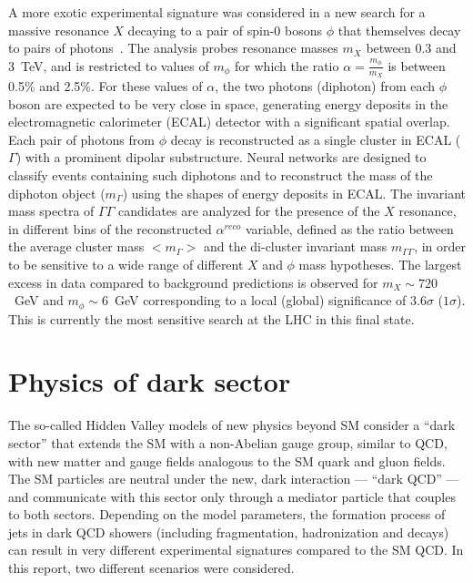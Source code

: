 \documentclass{moriond}
\begin{document}
A more exotic experimental signature was considered in a new search
for a massive resonance $X$ decaying to a pair of spin-0
bosons $\phi$ that themselves decay to pairs of photons~\cite{CMS:2024vjn}.
The analysis probes resonance masses $m_X$ between 0.3 and 3~TeV,
and is restricted to values of $m_{\phi}$ for which the ratio
$\alpha=\frac{m_{\phi}}{m_X}$ is between 0.5\% and 2.5\%. For these
values of $\alpha$, the two photons (diphoton) from each $\phi$ boson
are expected to be very close in space, generating energy deposits
in the electromagnetic calorimeter (ECAL) detector with a significant
spatial overlap.  Each pair of photons from $\phi$ decay is reconstructed
as a single cluster in ECAL ($\Gamma$) with a prominent dipolar
substructure. Neural networks are designed to classify events containing
such diphotons and to reconstruct the mass of the diphoton object ($m_{\Gamma}$)
using the shapes of energy deposits in ECAL. 
The invariant mass spectra of $\Gamma\Gamma$ candidates are
analyzed for the presence of the $X$ resonance, in different bins of
the reconstructed $\alpha^{reco}$ variable, defined as the ratio between the
average cluster mass $<m_{\Gamma}>$ and the di-cluster invariant mass $m_{\Gamma\Gamma}$,
in order to be sensitive to a wide range of different $X$ and $\phi$ mass
hypotheses. The largest excess in data compared to background
predictions is observed for $m_X \sim 720$~GeV and $m_{\phi} \sim 6$~GeV
corresponding to a local (global) significance of $3.6\sigma$
($1\sigma$). This is currently the most sensitive search at the LHC in this
final state.

\section{Physics of dark sector}

The so-called Hidden Valley models of new physics beyond SM consider a
``dark sector'' that extends the SM with a non-Abelian gauge group,
similar to QCD, with new matter and gauge
fields analogous to the SM quark and gluon fields. The SM particles
are neutral under the new, dark interaction — “dark QCD” — and
communicate with this sector only through a mediator particle that
couples to both sectors. Depending on the model parameters, the
formation process of jets in dark QCD showers (including fragmentation,
hadronization and decays) can result in very different experimental
signatures compared to the SM QCD. In this report, two different
scenarios were considered.
\end{document}
